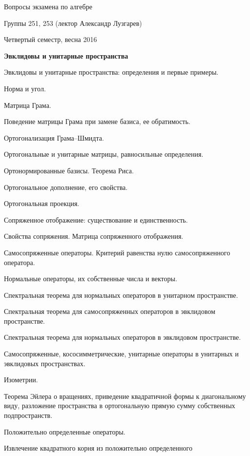 \documentclass[12pt]{article}
\newcommand\glava[1]{{\bf\hfill #1}}
\begin{document}
\begin{center}
{\Large Вопросы экзамена по алгебре}
\par\medskip
Группы 251, 253 (лектор Александр Лузгарев)
\par\medskip
Четвертый семестр, весна 2016
\end{center}

\glava{Эвклидовы и унитарные пространства}
\begin{compactenum}
\item Эвклидовы и унитарные пространства: определения и первые
  примеры.
\item Норма и угол.
\item Матрица Грама.
\item Поведение матрицы Грама при замене базиса, ее обратимость.
\item Ортогонализация Грама--Шмидта.
\item Ортогональные и унитарные матрицы, равносильные определения.
\item Ортонормированные базисы. Теорема Риса.
\item Ортогональное дополнение, его свойства.
\item Ортогональная проекция.
\item Сопряженное отображение: существование и единственность.
\item Свойства сопряжения. Матрица сопряженного отображения.
\item Самосопряженные операторы. Критерий равенства нулю самосопряженного оператора.
\item Нормальные операторы, их собственные числа и векторы.
\item Спектральная теорема для нормальных операторов в унитарном пространстве.
\item Спектральная теорема для самосопряженных операторов в эвклидовом пространстве.
\item Спектральная теорема для нормальных операторов в эвклидовом пространстве.
\item Самосопряженные, кососимметрические, унитарные операторы в
  унитарных и эвклидовых пространствах.
\item Изометрии.
\item Теорема Эйлера о вращениях, приведение квадратичной формы к
  диагональному виду, разложение пространства в ортогональную прямую
  сумму собственных подпространств.
\item Положительно определенные операторы.
\item Извлечение квадратного корня из положительно определенного

\end{compactenum}
\end{document}

